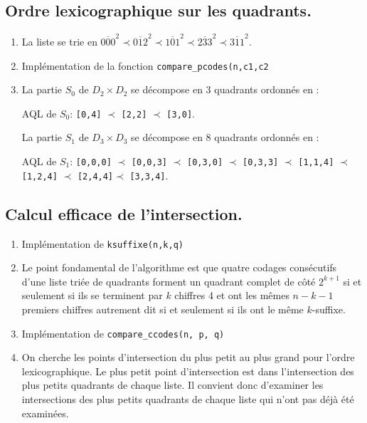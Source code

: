 \subsection{Ordre lexicographique sur les quadrants.}
\begin{enumerate}[resume]
 \item La liste se trie en $\overline{000}^2 \prec  \overline{012}^2 \prec  \overline{101}^2 \prec  \overline{233}^2 \prec  \overline{311}^2$. 

 \item Implémentation de la fonction \texttt{compare\_pcodes(n,c1,c2}


  \item La partie $S_0$ de $D_2 \times D_2$ se décompose en 3 quadrants ordonnés en :
\begin{center}
AQL de $S_0$:  \texttt{[0,4]} $\prec$ \texttt{[2,2]} $\prec$ \texttt{[3,0]}.
\end{center}
La partie $S_1$ de $D_3 \times D_3$ se décompose en 8 quadrants ordonnés en :
\begin{center}
AQL de $S_1$:  \texttt{[0,0,0]} $\prec$ \texttt{[0,0,3]} $\prec$ \texttt{[0,3,0]} $\prec$ \texttt{[0,3,3]} $\prec$ \texttt{[1,1,4]} $\prec$ \texttt{[1,2,4]} $\prec$ \texttt{[2,4,4]}$\prec$ \texttt{[3,3,4]}.
\end{center}   

\end{enumerate}


\subsection{Calcul efficace de l'intersection.}
\begin{enumerate}[resume]
 \item Implémentation de \texttt{ksuffixe(n,k,q)}


 \item Le point fondamental de l'algorithme est que quatre codages consécutifs d'une liste triée de quadrants forment un quadrant complet de côté $2^{k+1}$ si et seulement si ils se terminent par $k$ chiffres 4 et ont les mêmes $n-k-1$ premiers chiffres autrement dit si et seulement si ils ont le même $k$-suffixe.
 
 
 
 \item Implémentation de \texttt{compare\_ccodes(n, p, q)}


 \item On cherche les points d'intersection du plus petit au plus grand pour l'ordre lexicographique. Le plus petit point d'intersection est dans l'intersection des plus petits quadrants de chaque liste. Il convient donc d'examiner les intersections des plus petits quadrants de chaque liste qui n'ont pas déjà été examinées.
 
\end{enumerate}
